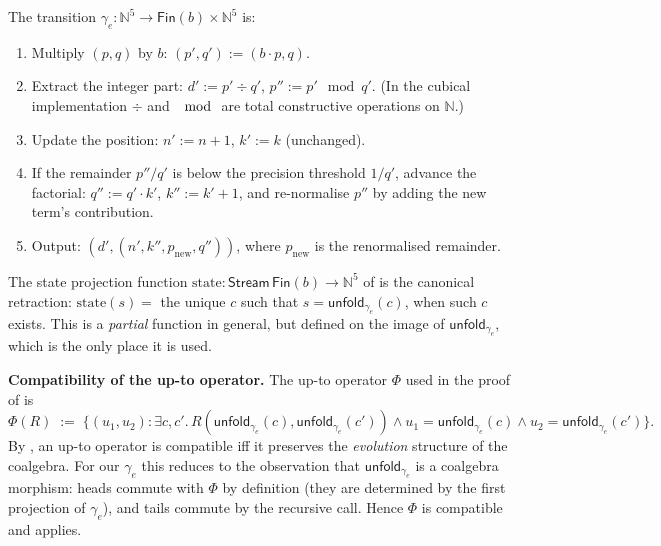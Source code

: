 \documentclass[12pt]{article}
\theoremstyle{definition}
\theoremstyle{remark}
\newcommand{\N}{\mathbb{N}}
\newcommand{\Stream}{\mathsf{Stream}}
\newcommand{\unfold}{\mathsf{unfold}}
\begin{document}
The transition $\gamma_e: \N^5 \to \mathsf{Fin}(b) \times \N^5$ is:

\begin{enumerate}
\item Multiply $(p, q)$ by $b$:
$(p', q') := (b\cdot p, q)$.
\item Extract the integer part: $d' := p' \div q'$, $p'' := p' \mod q'$.
(In the cubical implementation $\div$ and $\mod$ are total
constructive operations on $\N$.)
\item Update the position: $n' := n + 1$, $k' := k$ (unchanged).
\item If the remainder $p''/q'$ is below the precision threshold
$1/q'$, advance the factorial: $q'' := q' \cdot k'$, $k'' := k' + 1$,
and re-normalise $p''$ by adding the new term's contribution.
\item Output: $(d', (n', k'', p_{\mathrm{new}}, q''))$, where
$p_{\mathrm{new}}$ is the renormalised remainder.
\end{enumerate}

The state projection function $\mathrm{state}: \Stream\,\mathsf{Fin}(b) \to \N^5$
of  is the canonical retraction:
$\mathrm{state}(s) = $ the unique $c$ such that $s = \unfold_{\gamma_e}(c)$,
when such $c$ exists. This is a \emph{partial} function in
general, but defined on the image of $\unfold_{\gamma_e}$, which
is the only place it is used.

\textbf{Compatibility of the up-to operator.} The up-to operator
$\Phi$ used in the proof of  is
\[
\Phi(R) \;:=\; \{(u_1, u_2) :
  \exists c, c'.\, R(\unfold_{\gamma_e}(c), \unfold_{\gamma_e}(c'))
  \wedge u_1 = \unfold_{\gamma_e}(c)
  \wedge u_2 = \unfold_{\gamma_e}(c')
\}.
\]
By \cite[\S 6]{poussangiorgi}, an up-to operator is compatible
iff it preserves the \emph{evolution} structure of the coalgebra.
For our $\gamma_e$ this reduces to the observation that
$\unfold_{\gamma_e}$ is a coalgebra morphism: heads commute with
$\Phi$ by definition (they are determined by the first projection
of $\gamma_e$), and tails commute by the recursive call. Hence
$\Phi$ is compatible and  applies.
\end{document}
